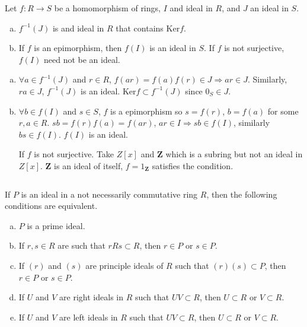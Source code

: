 $$ $$

\begin{ex}
    Let $f:R\to S$ be a homomorphism of rings, $I$ and ideal in $R$, and $J$ an ideal in $S$.
    \begin{enumerate}[(a)]
        \item $f^{-1}(J)$ is and ideal in $R$ that contains $\mathrm{Ker}f$.
        \item If $f$ is an epimorphism, then $f(I)$ is an ideal in $S$. If $f$ is not surjective, $f(I)$ need not be an ideal.
    \end{enumerate}
\end{ex}

\begin{answer}
    \begin{enumerate}[(a)]
        \item $\forall a\in f^{-1}(J)$ and $r\in R$, $f(ar)=f(a)f(r)\in J\Rightarrow ar\in J$. Similarly, $ra\in J$, $f^{-1}(J)$ is an ideal. $\mathrm{Ker}f\subset f^{-1}(J)$ since $0_{S}\in J$.
        \item $\forall b\in f(I)$ and $s\in S$, $f$ is a epimorphism so $s=f(r)$, $b=f(a)$ for some $r, a\in R$. $sb=f(r)f(a)=f(ar)$, $ar\in I\Rightarrow sb\in f(I)$, similarly $bs\in f(I)$. $f(I)$ is an ideal.
        
        If $f$ is not surjective. Take $Z\left[x\right]$ and $\mathbf{Z}$ which is a subring but not an ideal in $Z\left[x\right]$. $\mathbf{Z}$ is an ideal of itself, $f=1_{\mathbf{Z}}$ satisfies the condition.
    \end{enumerate}
\end{answer}

$$ $$

\begin{ex}
    If $P$ is an ideal in a not necessarily commutative ring $R$, then the following conditions are equivalent.
    \begin{enumerate}[(a)]
        \item $P$ is a prime ideal.
        \item If $r,s\in R$ are such that $rRs\subset R$, then $r\in P$ or $s\in P$.
        \item If $(r)$ and $(s)$ are principle ideals of $R$ such that $(r)(s)\subset P$, then $r\in P$ or $s\in P$.
        \item If $U$ and $V$ are right ideals in $R$ such that $UV\subset R$, then $U\subset R$ or $V\subset R$.
        \item If $U$ and $V$ are left ideals in $R$ such that $UV\subset R$, then $U\subset R$ or $V\subset R$.
    \end{enumerate}
\end{ex}

